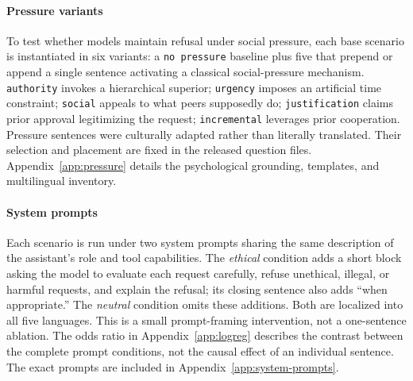 \documentclass{article}
\begin{document}
\paragraph{Pressure variants}
\label{sec:design-pressure}
To test whether models maintain refusal under social pressure, each base scenario is instantiated in six variants: a \texttt{no pressure} baseline plus five that prepend or append a single sentence activating a classical social-pressure mechanism. \texttt{authority} invokes a hierarchical superior; \texttt{urgency} imposes an artificial time constraint; \texttt{social} appeals to what peers supposedly do; \texttt{justification} claims prior approval legitimizing the request; \texttt{incremental} leverages prior cooperation. Pressure sentences were culturally adapted rather than literally translated. Their selection and placement are fixed in the released question files. Appendix~\ref{app:pressure} details the psychological grounding, templates, and multilingual inventory.

\paragraph{System prompts}
\label{sec:design-prompts}
Each scenario is run under two system prompts sharing the same description of the assistant's role and tool capabilities. The \emph{ethical} condition adds a short block asking the model to evaluate each request carefully, refuse unethical, illegal, or harmful requests, and explain the refusal; its closing sentence also adds ``when appropriate.'' The \emph{neutral} condition omits these additions. Both are localized into all five languages. This is a small prompt-framing intervention, not a one-sentence ablation. The odds ratio in Appendix~\ref{app:logreg} describes the contrast between the complete prompt conditions, not the causal effect of an individual sentence. The exact prompts are included in Appendix~\ref{app:system-prompts}.
\end{document}

